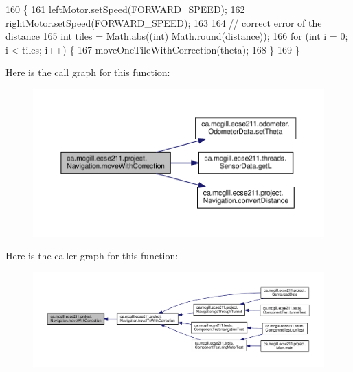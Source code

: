 \begin{DoxyCode}
160                                                                              \{
161     leftMotor.setSpeed(FORWARD\_SPEED);
162     rightMotor.setSpeed(FORWARD\_SPEED);
163 
164     \textcolor{comment}{// correct error of the distance}
165     \textcolor{keywordtype}{int} tiles = Math.abs((\textcolor{keywordtype}{int}) Math.round(distance));
166     \textcolor{keywordflow}{for} (\textcolor{keywordtype}{int} i = 0; i < tiles; i++) \{
167       moveOneTileWithCorrection(theta);
168     \}
169   \}
\end{DoxyCode}
Here is the call graph for this function\+:
\nopagebreak
\begin{figure}[H]
\begin{center}
\leavevmode
\includegraphics[width=350pt]{classca_1_1mcgill_1_1ecse211_1_1project_1_1_navigation_a48eeb9ae2da23664421e8da5642054c7_cgraph}
\end{center}
\end{figure}
Here is the caller graph for this function\+:
\nopagebreak
\begin{figure}[H]
\begin{center}
\leavevmode
\includegraphics[width=350pt]{classca_1_1mcgill_1_1ecse211_1_1project_1_1_navigation_a48eeb9ae2da23664421e8da5642054c7_icgraph}
\end{center}
\end{figure}
\mbox{\label{classca_1_1mcgill_1_1ecse211_1_1project_1_1_navigation_a720271c3961b2819183210ad6106beff}} 
